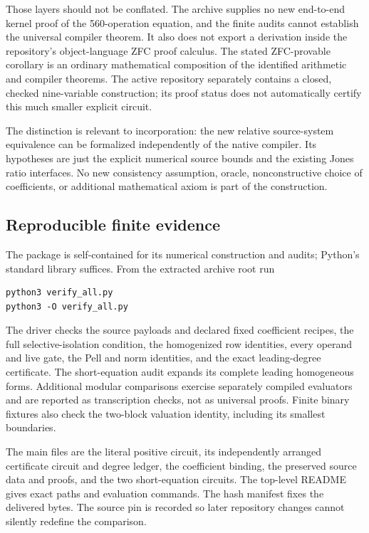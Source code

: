 \documentclass[11pt]{article}
\theoremstyle{remark}\newtheorem{remark}[theorem]{Remark}
\begin{document}
Those layers should not be conflated. The archive supplies no new
end-to-end kernel proof of the 560-operation equation, and the finite
audits cannot establish the universal compiler theorem. It also does not
export a derivation inside the repository's object-language ZFC proof
calculus. The stated ZFC-provable corollary is an ordinary mathematical
composition of the identified arithmetic and compiler theorems. The
active repository separately contains a closed, checked nine-variable
construction; its proof status does not automatically certify this much
smaller explicit circuit.

The distinction is relevant to incorporation: the new relative
source-system equivalence can be formalized independently of the native
compiler. Its hypotheses are just the explicit numerical source bounds
and the existing Jones ratio interfaces. No new consistency assumption,
oracle, nonconstructive choice of coefficients, or additional mathematical
axiom is part of the construction.

\subsection{Reproducible finite evidence}

The package is self-contained for its numerical construction and audits;
Python's standard library suffices. From the extracted archive root run
\begin{verbatim}
python3 verify_all.py
python3 -O verify_all.py
\end{verbatim}
The driver checks the source payloads and declared fixed coefficient
recipes, the full selective-isolation condition, the homogenized row
identities, every operand and live gate, the Pell and norm identities,
and the exact leading-degree certificate. The short-equation audit
expands its complete leading homogeneous forms. Additional modular
comparisons exercise separately compiled evaluators and are reported as
transcription checks, not as universal proofs. Finite binary fixtures
also check the two-block valuation identity, including its smallest
boundaries.

The main files are the literal positive circuit, its independently
arranged certificate circuit and degree ledger, the coefficient binding,
the preserved source data and proofs, and the two short-equation circuits.
The top-level README gives exact paths and evaluation commands. The
hash manifest fixes the delivered bytes. The source pin is recorded so
later repository changes cannot silently redefine the comparison.
\end{document}

